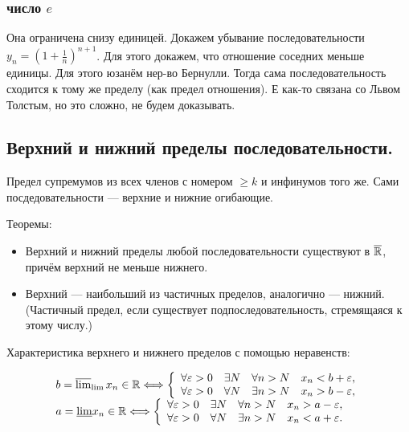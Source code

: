 \documentclass[12pt, a4paper]{article}
\begin{document}
\subsubsection{число $e$}
    Она ограничена снизу единицей. Докажем убывание последовательности $y_n = (1 + \frac{1}{n})^{n + 1}$. 
    Для этого докажем, что отношение соседних меньше единицы.
    Для этого юзанём нер-во Бернулли.
    Тогда сама последовательность сходится к тому же пределу (как предел отношения).
    Е как-то связана со Львом Толстым, но это сложно, не будем доказывать.

\subsection{Верхний и нижний пределы последовательности.}

Предел супремумов из всех членов с номером $\geqslant k$ и инфинумов того же.
Сами посдедовательности — верхние и нижние огибающие.

Теоремы:
\begin{itemize}
    \item Верхний и нижний пределы любой последовательности существуют в $\overline{{\mathbb{R}}}$, причём верхний не меньше нижнего.
    \item Верхний — наибольший из частичных пределов, аналогично — нижний. (Частичный предел, если существует подпоследовательность, стремящаяся к этому числу.)
\end{itemize}

Характеристика верхнего и нижнего пределов с помощью неравенств:

\begin{equation}
    \begin{array}{l}
        b=\varlimsup_{\lim } x_{n} \in \mathbb{R} \Longleftrightarrow\left\{\begin{array}{llll}
        \forall \varepsilon>0 & \exists N & \forall n>N & x_{n}<b+\varepsilon, \\
        \forall \varepsilon>0 & \forall N & \exists n>N & x_{n}>b-\varepsilon,
    \end{array}\right. \\
        a=\underline{\lim } x_{n} \in \mathbb{R} \Longleftrightarrow\left\{\begin{array}{llll}
        \forall \varepsilon>0 & \exists N & \forall n>N & x_{n}>a-\varepsilon, \\
        \forall \varepsilon>0 & \forall N & \exists n>N & x_{n}<a+\varepsilon .
    \end{array}\right.
    \end{array}
\end{equation}
\end{document}
